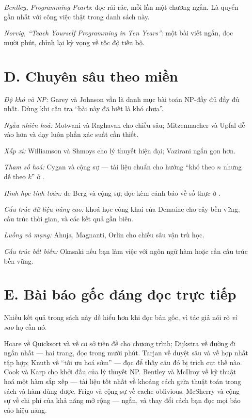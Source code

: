 \documentclass[algorithm.tex]{subfiles}
\begin{document}
\emph{Bentley, \emph{Programming Pearls}}\cite{bentley2000}: đọc rải rác, mỗi lần một chương ngắn. Là quyển gần nhất với công việc thật trong danh sách này.

\emph{Norvig, ``Teach Yourself Programming in Ten Years''}\cite{norvig2001}: một bài viết ngắn, đọc mười phút, chỉnh lại kỳ vọng về tốc độ tiến bộ.

\section*{D. Chuyên sâu theo miền}

\emph{Độ khó và NP:} Garey và Johnson\cite{garey1979} vẫn là danh mục bài toán NP-đầy đủ đầy đủ nhất. Dùng khi cần tra ``bài này đã biết là khó chưa''.

\emph{Ngẫu nhiên hoá:} Motwani và Raghavan\cite{motwani1995} cho chiều sâu; Mitzenmacher và Upfal\cite{mitzenmacher2005} dễ vào hơn và dạy luôn phần xác suất cần thiết.

\emph{Xấp xỉ:} Williamson và Shmoys\cite{williamson2011} cho lý thuyết hiện đại; Vazirani\cite{vazirani2001} ngắn gọn hơn.

\emph{Tham số hoá:} Cygan và cộng sự\cite{cygan2015} --- tài liệu chuẩn cho hướng ``khó theo \(n\) nhưng dễ theo \(k\)'' ở .

\emph{Hình học tính toán:} de Berg và cộng sự\cite{deberg2008}; đọc kèm cảnh báo về số thực ở .

\emph{Cấu trúc dữ liệu nâng cao:} khoá học công khai của Demaine\cite{demaine6851} cho cây bền vững, cấu trúc thời gian, và các kết quả gần biên.

\emph{Luồng và mạng:} Ahuja, Magnanti, Orlin\cite{ahuja1993} cho chiều sâu vận trù học.

\emph{Cấu trúc bất biến:} Okasaki\cite{okasaki1998} nếu bạn làm việc với ngôn ngữ hàm hoặc cần cấu trúc bền vững.

\section*{E. Bài báo gốc đáng đọc trực tiếp}

Nhiều kết quả trong sách này dễ hiểu hơn khi đọc bản gốc, vì tác giả nói rõ \emph{vì sao} họ cần nó.

Hoare về Quicksort\cite{hoare1962} và về cơ sở tiên đề cho chương trình\cite{hoare1969}; Dijkstra về đường đi ngắn nhất\cite{dijkstra1959} --- hai trang, đọc trong mười phút. Tarjan về duyệt sâu\cite{tarjan1972} và về hợp nhất tập hợp\cite{tarjan1975}; Knuth về ``tối ưu hoá sớm''\cite{knuth1974goto} --- đọc để thấy câu đó bị trích cụt thế nào. Cook\cite{cook1971} và Karp\cite{karp1972} cho khởi đầu của lý thuyết NP. Bentley và McIlroy về kỹ thuật hoá một hàm sắp xếp\cite{bentley1993sort} --- tài liệu tốt nhất về khoảng cách giữa thuật toán trong sách và hàm dùng được. Frigo và cộng sự về cache-oblivious\cite{frigo1999}. McSherry và cộng sự về chi phí của khả năng mở rộng\cite{mcsherry2015} --- ngắn, và thay đổi cách bạn đọc mọi báo cáo hiệu năng.
\end{document}
